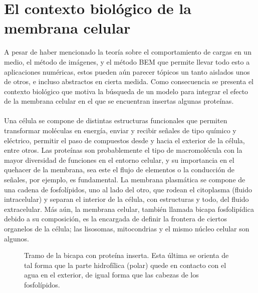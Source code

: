 \documentclass[12pt, oneside, numbers, spanish]{ezthesis}
\numberwithin{equation}{section}
\begin{document}
\section{El contexto biológico de la membrana celular}\label{Sec:Cell_Bio}
A pesar de haber mencionado la teoría sobre el comportamiento de cargas en un medio, el método de imágenes, y el método BEM que permite llevar todo esto a aplicaciones numéricas, estos pueden aún parecer tópicos un tanto aislados unos de otros, e incluso abstractos en cierta medida. Como consecuencia se presenta el contexto biológico que motiva la búsqueda de un modelo para integrar el efecto de la membrana celular en el que se encuentran insertas algunas proteínas.\\\\
Una célula se compone de distintas estructuras funcionales que permiten transformar moléculas en energía, enviar y recibir señales de tipo químico y eléctrico, permitir el paso de compuestos desde y hacia el exterior de la célula, entre otros. Las proteínas son probablemente el tipo de macromolécula con la mayor diversidad de funciones en el entorno celular, y su importancia en el quehacer de la membrana, sea este el flujo de elementos o la conducción de señales, por ejemplo, es fundamental. La membrana plasmática se compone de una cadena de fosfolípidos, uno al lado del otro, que rodean el citoplasma (fluido intracelular) y separan el interior de la célula, con estructuras y todo, del fluido extracelular. Más aún, la membrana celular, también llamada bicapa fosfolipídica debido a su composición, es la encargada de definir la frontera de ciertos organelos de la célula; las lisosomas, mitocondrias y el mismo núcleo celular son algunos.
\begin{figure}[H]
	\centering
	
	\caption{Tramo de la bicapa con proteína inserta. Esta última se orienta de tal forma que la parte hidrofílica (polar) quede en contacto con el agua en el exterior, de igual forma que las cabezas de los fosfolípidos.} \label{Fig:Fig_5-2}
\end{figure}
\end{document}
